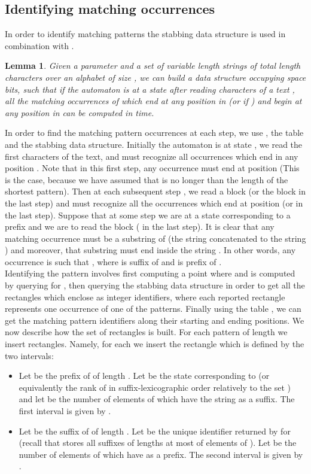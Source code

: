 \documentclass{article}
\newcommand{\?}{\mskip1.5mu}
\newtheorem{lemma}{Lemma}
\begin{document}
\subsection{Identifying matching occurrences}
\label{subsec:ident_occ}
In order to identify matching patterns the  stabbing data structure is used in combination with . 
\begin{lemma}
\label{lemma:report1_lemma}
Given a parameter  and a set  of variable length strings of total length  characters over an alphabet of size , we can build a data structure occupying space  bits, such that if the automaton is at a state  after reading  characters of a text , all the  matching occurrences of  which end at any position in  (or  if ) and begin at any position in  can be computed in  time. 
\end{lemma}
In order to find the matching pattern occurrences at each step, we use , the table  and the  stabbing data structure.
Initially the automaton is at state , we read the first  characters of the text,  and must recognize all occurrences which end in any position . Note that in this first step, any occurrence must end at position  (This is the case, because we have assumed that  is no longer than the length of the shortest pattern). Then at each subsequent step , we read a block  (or the block  in the last step) and must recognize all the occurrences which end at position  (or  in the last step). Suppose that at some step  we are at a state  corresponding to a prefix  and we are to read the block  ( in the last step). It is clear that any matching occurrence must be a substring of  (the string  concatenated to the string ) and moreover, that substring must end inside the string . In other words, any occurrence  is such that , where  is suffix of  and  is prefix of . 
\\
Identifying the pattern involves first computing a point  where  and  is computed by querying  for , then querying the  stabbing data structure in order to get all the rectangles which enclose  as integer identifiers, where each reported rectangle represents one occurrence of one of the patterns. Finally using the table , we can get the matching pattern identifiers along their starting and ending positions. 
We now describe how the set of rectangles is built. For each pattern  of length  we insert  rectangles. Namely, for each  we insert the rectangle which is defined by the two intervals:
\begin{itemize}
\item Let  be the prefix of  of length . Let  be the state corresponding to  (or equivalently the rank of  in suffix-lexicographic order relatively to the set ) and let  be the number of elements of  which have the string  as a suffix. The first interval is given by .
\item Let  be the suffix of  of length . Let  be the unique identifier returned by  for  (recall that  stores all suffixes of lengths at most  of elements of ). Let  be the number of elements of  which have  as a prefix. The second interval is given by . 
\end{itemize}
\end{document}
